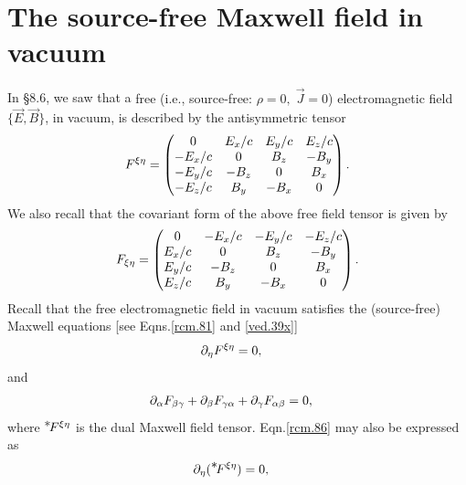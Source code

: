 \section{The source-free Maxwell field in\\ vacuum} 
In \S8.6, we saw that a {free  (i.e., source-free: $\rho=0, 
\; \vec{J}=0 $) electromagnetic field 
$\{\vec{E},\vec{B}\}$, 
in vacuum}, is described by the antisymmetric tensor
\begin{align}\label{rcm.83}
F^{{\xi}{\eta}} =\begin{pmatrix}
 0       &   E_x/c  & E_y/c    & E_z/c\\
-E_x/c &   0        &  B_z      & -B_y\\
-E_y/c & - B_z     &  0         &  B_x\\
-E_z/c &   B_y     & -B_x      &  0\\
\end{pmatrix}.
\end{align}
We also recall that the covariant form of the above free 
field tensor is given by
\begin{align}\label{rcm.84}
F_{{\xi}{\eta}} =\begin{pmatrix}
0      &   -E_x/c   & -E_y/c    & -E_z/c\\
E_x/c &   0         &  B_z       & -B_y\\
E_y/c & - B_z     &  0           &  B_x\\
E_z/c &   B_y     & -B_x        &  0\\
\end{pmatrix}.
\end{align}
Recall that the  free electromagnetic field in vacuum 
satisfies the  (source-free) Maxwell equations [see 
Eqns.\eqref{rcm.81} and  \eqref{ved.39x}]
\begin{align}\label{rcm.85}
{\ensuremath{\partial}}_{{\eta}} F^{{\xi}{\eta}}&=0,
\end{align}
and
\begin{align}\label{rcm.86}
{\ensuremath{\partial}}_{{\alpha}} F_{{\beta}{\gamma}}
+{\partial}_{{\beta}} F_{{\gamma}{\alpha}}+{\partial}_{{\gamma}} F_{{\alpha}{\beta}} &=0,
\end{align}
where ${}^{{\textstyle \ast}} \negthinspace{F} ^{{\xi}{\eta}}$ is the {dual} Maxwell field
tensor. Eqn.\eqref{rcm.86} may also be expressed as
\begin{align}\label{rcm.87}
{\ensuremath{\partial}}_{{\eta}}({}^{{\textstyle \ast}} \negthinspace{F} ^{{\xi}{\eta}})&=0,
\end{align}


